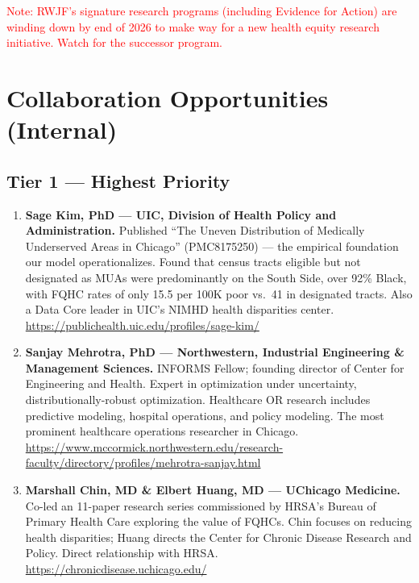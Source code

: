 \documentclass[11pt]{article}
\begin{document}
\textcolor{red}{Note: RWJF's signature research programs (including Evidence for Action) are winding down by end of 2026 to make way for a new health equity research initiative. Watch for the successor program.}


\section*{Collaboration Opportunities (Internal)}

\subsection*{Tier 1 — Highest Priority}

\begin{enumerate}

\item \textbf{Sage Kim, PhD — UIC, Division of Health Policy and Administration.}
Published ``The Uneven Distribution of Medically Underserved Areas in Chicago'' (PMC8175250) — the empirical foundation our model operationalizes. Found that census tracts eligible but not designated as MUAs were predominantly on the South Side, over 92\% Black, with FQHC rates of only 15.5 per 100K poor vs.\ 41 in designated tracts. Also a Data Core leader in UIC's NIMHD health disparities center. \\
\url{https://publichealth.uic.edu/profiles/sage-kim/}

\item \textbf{Sanjay Mehrotra, PhD — Northwestern, Industrial Engineering \& Management Sciences.}
INFORMS Fellow; founding director of Center for Engineering and Health. Expert in optimization under uncertainty, distributionally-robust optimization. Healthcare OR research includes predictive modeling, hospital operations, and policy modeling. The most prominent healthcare operations researcher in Chicago. \\
\url{https://www.mccormick.northwestern.edu/research-faculty/directory/profiles/mehrotra-sanjay.html}

\item \textbf{Marshall Chin, MD \& Elbert Huang, MD — UChicago Medicine.}
Co-led an 11-paper research series commissioned by HRSA's Bureau of Primary Health Care exploring the value of FQHCs. Chin focuses on reducing health disparities; Huang directs the Center for Chronic Disease Research and Policy. Direct relationship with HRSA. \\
\url{https://chronicdisease.uchicago.edu/}


\end{enumerate}
\end{document}
